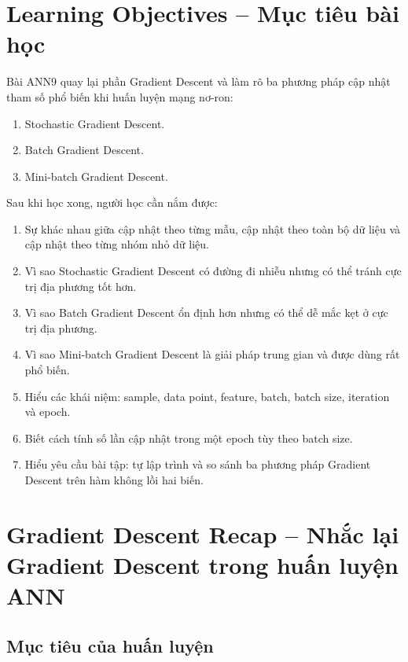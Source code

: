 

\section*{Learning Objectives -- Mục tiêu bài học}

Bài ANN9 quay lại phần Gradient Descent và làm rõ ba phương pháp cập nhật tham số phổ biến khi huấn luyện mạng nơ-ron:

\begin{enumerate}[label=\arabic*.]
    \item Stochastic Gradient Descent.
    \item Batch Gradient Descent.
    \item Mini-batch Gradient Descent.
\end{enumerate}

Sau khi học xong, người học cần nắm được:

\begin{enumerate}[label=\arabic*.]
    \item Sự khác nhau giữa cập nhật theo từng mẫu, cập nhật theo toàn bộ dữ liệu và cập nhật theo từng nhóm nhỏ dữ liệu.
    \item Vì sao Stochastic Gradient Descent có đường đi nhiễu nhưng có thể tránh cực trị địa phương tốt hơn.
    \item Vì sao Batch Gradient Descent ổn định hơn nhưng có thể dễ mắc kẹt ở cực trị địa phương.
    \item Vì sao Mini-batch Gradient Descent là giải pháp trung gian và được dùng rất phổ biến.
    \item Hiểu các khái niệm: sample, data point, feature, batch, batch size, iteration và epoch.
    \item Biết cách tính số lần cập nhật trong một epoch tùy theo batch size.
    \item Hiểu yêu cầu bài tập: tự lập trình và so sánh ba phương pháp Gradient Descent trên hàm không lồi hai biến.
\end{enumerate}

\section{Gradient Descent Recap -- Nhắc lại Gradient Descent trong huấn luyện ANN}

\subsection{Mục tiêu của huấn luyện}

